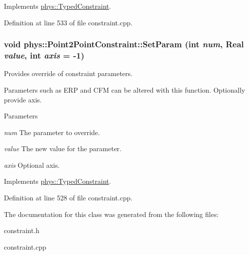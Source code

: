 Implements \hyperlink{classphys_1_1TypedConstraint_ab6140d40e9476c3dc46e2802e8097421}{phys::TypedConstraint}.



Definition at line 533 of file constraint.cpp.

\hypertarget{classphys_1_1Point2PointConstraint_ad6f28464773121658e54e8bde2a14704}{
\subsubsection[{SetParam}]{\setlength{\rightskip}{0pt plus 5cm}void phys::Point2PointConstraint::SetParam (int {\em num}, \/  {\bf Real} {\em value}, \/  int {\em axis} = {\ttfamily -\/1})}}
\label{da/dfb/classphys_1_1Point2PointConstraint_ad6f28464773121658e54e8bde2a14704}


Provides override of constraint parameters. 

Parameters such as ERP and CFM can be altered with this function. Optionally provide axis. 
\begin{DoxyParams}{Parameters}
\item[{\em num}]The parameter to override. \item[{\em value}]The new value for the parameter. \item[{\em axis}]Optional axis. \end{DoxyParams}


Implements \hyperlink{classphys_1_1TypedConstraint_a31a20a74094f0cb8e4f82d1f99725415}{phys::TypedConstraint}.



Definition at line 528 of file constraint.cpp.



The documentation for this class was generated from the following files:\begin{DoxyCompactItemize}
\item 
constraint.h\item 
constraint.cpp\end{DoxyCompactItemize}
